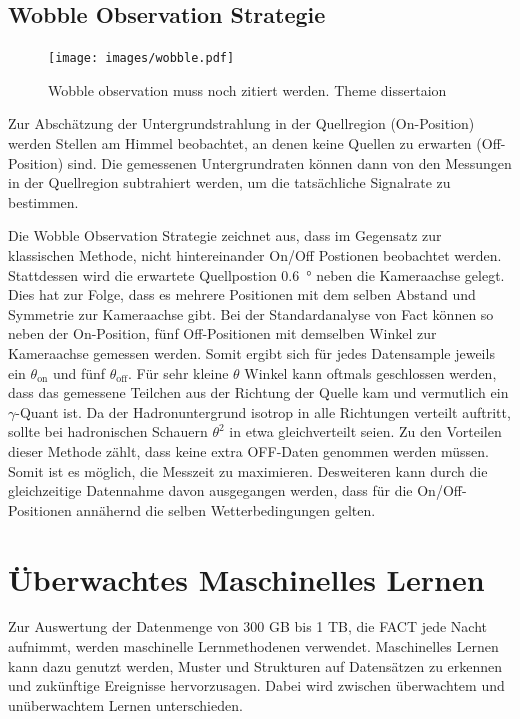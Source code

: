 \section{Wobble Observation Strategie}
\begin{figure}
  \texttt{[image: images/wobble.pdf]}
  \caption{Wobble observation muss noch zitiert werden. Theme dissertaion}
\end{figure}
Zur Abschätzung der Untergrundstrahlung in der Quellregion (On-Position) werden Stellen am Himmel beobachtet, an denen keine Quellen zu erwarten (Off-Position) sind.
Die gemessenen Untergrundraten können dann von den Messungen in der Quellregion subtrahiert werden, um die tatsächliche Signalrate zu bestimmen.

Die Wobble Observation Strategie zeichnet aus, dass im Gegensatz zur klassischen Methode, nicht hintereinander On/Off Postionen beobachtet werden. 
Stattdessen wird die erwartete Quellpostion \SI{0.6}{\degree} neben die Kameraachse gelegt. 
Dies hat zur Folge, dass es mehrere Positionen mit dem selben Abstand und Symmetrie zur Kameraachse gibt. 
Bei der Standardanalyse von Fact können so neben der On-Position, fünf Off-Positionen mit demselben Winkel zur Kameraachse gemessen werden. 
Somit ergibt sich für jedes Datensample jeweils ein $\theta_\text{on}$ und fünf $\theta_\text{off}$. 
Für sehr kleine $\theta$ Winkel kann oftmals geschlossen werden, dass das gemessene Teilchen aus der Richtung der Quelle kam und vermutlich ein $\gamma$-Quant ist. 
Da der Hadronuntergrund isotrop in alle Richtungen verteilt auftritt, sollte bei hadronischen Schauern $\theta^{2}$ in etwa gleichverteilt seien. 
Zu den Vorteilen dieser Methode zählt, dass keine extra OFF-Daten genommen werden müssen. 
Somit ist es möglich, die Messzeit zu maximieren. 
Desweiteren kann durch die gleichzeitige Datennahme davon ausgegangen werden, dass für die On/Off-Positionen annähernd die selben Wetterbedingungen gelten. 

\chapter{Überwachtes Maschinelles Lernen}
Zur Auswertung der Datenmenge von 300 GB bis 1 TB, die FACT jede Nacht aufnimmt, werden maschinelle Lernmethodenen verwendet. 
Maschinelles Lernen kann dazu genutzt werden, Muster und Strukturen auf Datensätzen zu erkennen und zukünftige Ereignisse hervorzusagen. 
Dabei wird zwischen überwachtem und unüberwachtem Lernen unterschieden.

